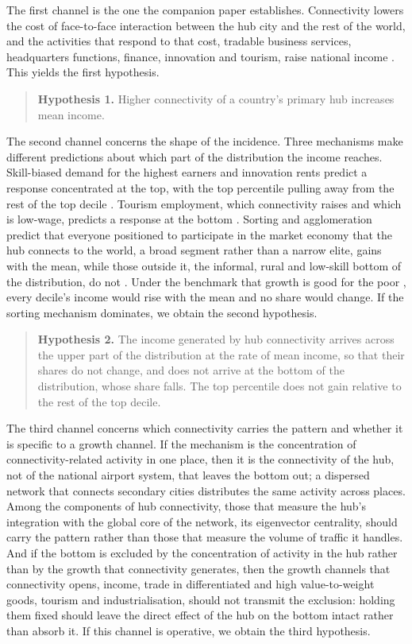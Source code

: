 The first channel is the one the companion paper establishes. Connectivity lowers the cost of face-to-face interaction between the hub city and the rest of the world, and the activities that respond to that cost, tradable business services, headquarters functions, finance, innovation and tourism, raise national income \citep{Campante_2018,Giroud_2013,Yue_2026}. This yields the first hypothesis.

\begin{quote}
\textbf{Hypothesis 1.} Higher connectivity of a country's primary hub increases mean income.
\end{quote}

The second channel concerns the shape of the incidence. Three mechanisms make different predictions about which part of the distribution the income reaches. Skill-biased demand for the highest earners and innovation rents predict a response concentrated at the top, with the top percentile pulling away from the rest of the top decile \citep{Aghion_2018}. Tourism employment, which connectivity raises and which is low-wage, predicts a response at the bottom \citep{Khadaroo_2008,Faber_2019}. Sorting and agglomeration predict that everyone positioned to participate in the market economy that the hub connects to the world, a broad segment rather than a narrow elite, gains with the mean, while those outside it, the informal, rural and low-skill bottom of the distribution, do not \citep{Diamond_2016,Gaubert_2018,Young_2013}. Under the benchmark that growth is good for the poor \citep{Dollar_2016}, every decile's income would rise with the mean and no share would change. If the sorting mechanism dominates, we obtain the second hypothesis.

\begin{quote}
\textbf{Hypothesis 2.} The income generated by hub connectivity arrives across the upper part of the distribution at the rate of mean income, so that their shares do not change, and does not arrive at the bottom of the distribution, whose share falls. The top percentile does not gain relative to the rest of the top decile.
\end{quote}

The third channel concerns which connectivity carries the pattern and whether it is specific to a growth channel. If the mechanism is the concentration of connectivity-related activity in one place, then it is the connectivity of the hub, not of the national airport system, that leaves the bottom out; a dispersed network that connects secondary cities distributes the same activity across places. Among the components of hub connectivity, those that measure the hub's integration with the global core of the network, its eigenvector centrality, should carry the pattern rather than those that measure the volume of traffic it handles. And if the bottom is excluded by the concentration of activity in the hub rather than by the growth that connectivity generates, then the growth channels that connectivity opens, income, trade in differentiated and high value-to-weight goods, tourism and industrialisation, should not transmit the exclusion: holding them fixed should leave the direct effect of the hub on the bottom intact rather than absorb it. If this channel is operative, we obtain the third hypothesis.

